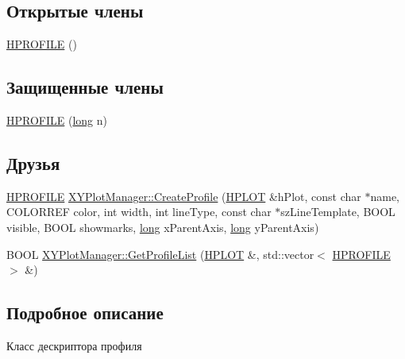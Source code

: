 \subsection*{Открытые члены}
\begin{DoxyCompactItemize}
\item 
\hyperlink{classxyplot_1_1_h_p_r_o_f_i_l_e_a70804411bb38e9b9c7304dc71335c823}{H\-P\-R\-O\-F\-I\-L\-E} ()
\end{DoxyCompactItemize}
\subsection*{Защищенные члены}
\begin{DoxyCompactItemize}
\item 
\hyperlink{classxyplot_1_1_h_p_r_o_f_i_l_e_a179d13e5b95a14c9188d3c6f6654d4ae}{H\-P\-R\-O\-F\-I\-L\-E} (\hyperlink{namespacexyplot_a27bc71b0bdfac09495e7e531d8a918c5}{long} n)
\end{DoxyCompactItemize}
\subsection*{Друзья}
\begin{DoxyCompactItemize}
\item 
\hyperlink{classxyplot_1_1_h_p_r_o_f_i_l_e}{H\-P\-R\-O\-F\-I\-L\-E} \hyperlink{classxyplot_1_1_h_p_r_o_f_i_l_e_a6850dbfafb6d482146f5a6da4a7d62ec}{X\-Y\-Plot\-Manager\-::\-Create\-Profile} (\hyperlink{classxyplot_1_1_h_p_l_o_t}{H\-P\-L\-O\-T} \&h\-Plot, const char $\ast$name, C\-O\-L\-O\-R\-R\-E\-F color, int width, int line\-Type, const char $\ast$sz\-Line\-Template, B\-O\-O\-L visible, B\-O\-O\-L showmarks, \hyperlink{namespacexyplot_a27bc71b0bdfac09495e7e531d8a918c5}{long} x\-Parent\-Axis, \hyperlink{namespacexyplot_a27bc71b0bdfac09495e7e531d8a918c5}{long} y\-Parent\-Axis)
\item 
B\-O\-O\-L \hyperlink{classxyplot_1_1_h_p_r_o_f_i_l_e_a899707577b96da846fcf3489bd3e483b}{X\-Y\-Plot\-Manager\-::\-Get\-Profile\-List} (\hyperlink{classxyplot_1_1_h_p_l_o_t}{H\-P\-L\-O\-T} \&, std\-::vector$<$ \hyperlink{classxyplot_1_1_h_p_r_o_f_i_l_e}{H\-P\-R\-O\-F\-I\-L\-E} $>$ \&)
\end{DoxyCompactItemize}


\subsection{Подробное описание}
Класс дескриптора профиля 

